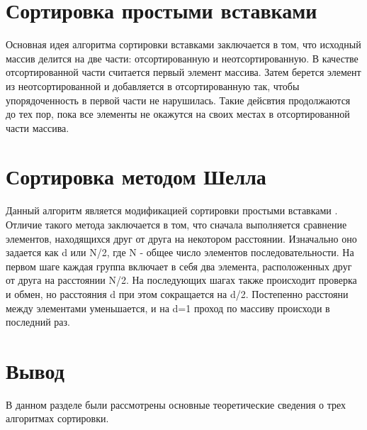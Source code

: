 \section{Сортировка простыми вставками}
Основная идея алгоритма сортировки вставками заключается в том, что исходный массив делится на две части: отсортированную и неотсортированную. В качестве отсортированной части считается первый элемент массива\cite{insert}. Затем берется элемент из неотсортированной и добавляется в отсортированную так, чтобы упорядоченность в первой части не нарушилась. Такие дейсвтия продолжаются до тех пор, пока все элементы не окажутся на своих местах в отсортированной части массива.

\section{Сортировка методом Шелла}
Данный алгоритм является модификацией сортировки простыми вставками \cite{shell}. Отличие такого метода заключается в том, что сначала выполняется сравнение элементов, находящихся друг от друга на некотором расстоянии. Изначально оно задается как d или N/2, где N - общее число элементов последовательности. На первом шаге каждая группа включает в себя два элемента, расположенных друг от друга на расстоянии N/2. На последующих шагах также происходит проверка и обмен, но расстояния d при этом сокращается на d/2. Постепенно расстояни между элементами уменьшается, и на d=1 проход по массиву происходи в последний раз. 

\section{Вывод}
В данном разделе были рассмотрены основные теоретические сведения о трех алгоритмах сортировки. 